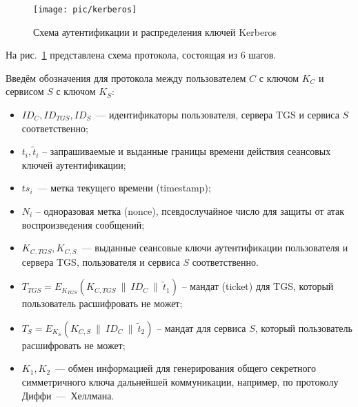 \begin{figure}[!ht]
	\centering
	\texttt{[image: pic/kerberos]}
	\caption{Схема аутентификации и распределения ключей Kerberos\label{fig:kerberos}}
\end{figure}

На рис.~\ref{fig:kerberos} представлена схема протокола, состоящая из 6 шагов.

Введём обозначения для протокола между пользователем $C$ с ключом $K_C$ и сервисом $S$ с ключом $K_S$:
\begin{itemize}
    \item $ID_C, ID_{TGS}, ID_S$~--- идентификаторы пользователя, сервера TGS и сервиса $S$ соответственно;
    \item $t_i, \tilde{t}_i$ -- запрашиваемые и выданные границы времени действия сеансовых ключей аутентификации;
    \item $ts_i$~--- метка текущего времени (timestamp);
    \item $N_i$ -- одноразовая метка (nonce), псевдослучайное число для защиты от атак воспроизведения сообщений;
    \item $K_{C,TGS}, K_{C,S}$~--- выданные сеансовые ключи аутентификации пользователя и сервера TGS, пользователя и сервиса $S$ соответственно.
    \item $T_{TGS} = E_{K_{TGS}}(K_{C,TGS} ~\|~ ID_C ~\|~ \tilde{t}_1)$ -- мандат (ticket) для TGS, который пользователь расшифровать не может;
    \item $T_{S} = E_{K_S}(K_{C,S} ~\|~ ID_C ~\|~ \tilde{t}_2)$ -- мандат для сервиса $S$, который пользователь расшифровать не может;
    \item $K_1, K_2$~--- обмен информацией для генерирования общего секретного симметричного ключа дальнейшей коммуникации, например, по протоколу Диффи~---~Хеллмана.
\end{itemize}

